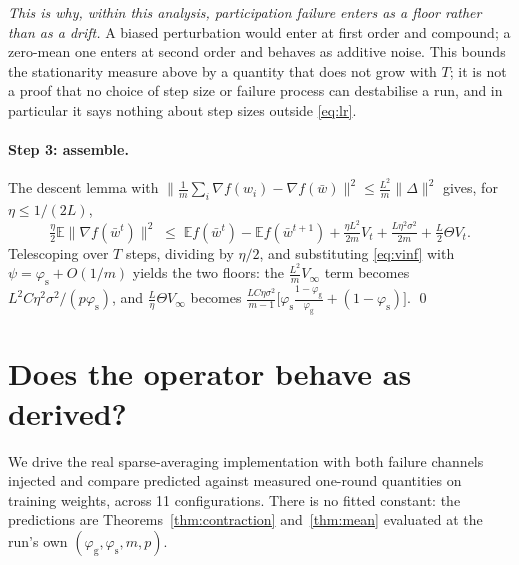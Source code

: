 \documentclass{article}
\theoremstyle{plain}
\newcommand{\pg}{\varphi_{\mathrm{g}}}
\newcommand{\ps}{\varphi_{\mathrm{s}}}
\newcommand{\E}{\mathbb{E}}
\begin{document}
\emph{This is why, within this analysis, participation failure enters as a
floor rather than as a drift.} A biased perturbation would enter at first order
and compound; a zero-mean one enters at second order and behaves as additive
noise. This bounds the stationarity measure above by a quantity that does not
grow with $T$; it is not a proof that no choice of step size or failure process
can destabilise a run, and in particular it says nothing about step sizes
outside \eqref{eq:lr}.

\paragraph{Step 3: assemble.} The descent lemma with
$\|\frac1m\sum_i\nabla f(w_i)-\nabla f(\bar w)\|^2 \le \frac{L^2}{m}\|\Delta\|^2$
gives, for $\eta\le 1/(2L)$,
\[
\tfrac{\eta}{2}\E\|\nabla f(\bar w^t)\|^2
 \;\le\; \E f(\bar w^t) - \E f(\bar w^{t+1})
 + \tfrac{\eta L^2}{2m}V_t + \tfrac{L\eta^2\sigma^2}{2m}
 + \tfrac{L}{2}\Theta V_t .
\]
Telescoping over $T$ steps, dividing by $\eta/2$, and substituting
\eqref{eq:vinf} with $\psi = \ps + O(1/m)$ yields the two floors: the
$\frac{L^2}{m}V_\infty$ term becomes $L^2C\eta^2\sigma^2/(p\ps)$, and
$\frac{L}{\eta}\Theta V_\infty$ becomes
$\frac{LC\eta\sigma^2}{m-1}\big[\ps\frac{1-\pg}{\pg}+(1-\ps)\big]$. \qed

\section{Does the operator behave as derived?}\label{app:exact}

We drive the real sparse-averaging implementation with both failure channels
injected and compare predicted against measured one-round quantities on
training weights, across 11 configurations. There is no fitted constant: the
predictions are Theorems~\ref{thm:contraction} and~\ref{thm:mean} evaluated at
the run's own $(\pg,\ps,m,p)$.
\end{document}
